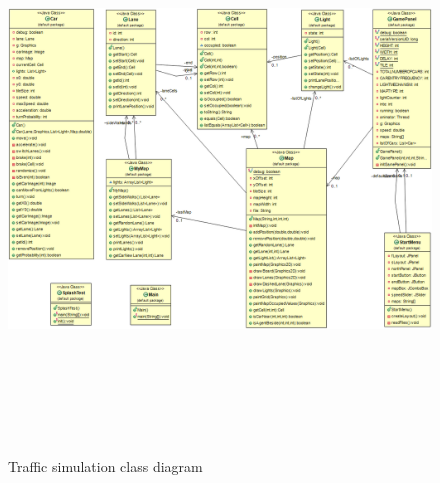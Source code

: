 \begin{figure}[H]
\includegraphics[width=16cm, height=15cm]{pics/classDiagram}
\caption{Traffic simulation class diagram}
\end{figure}

